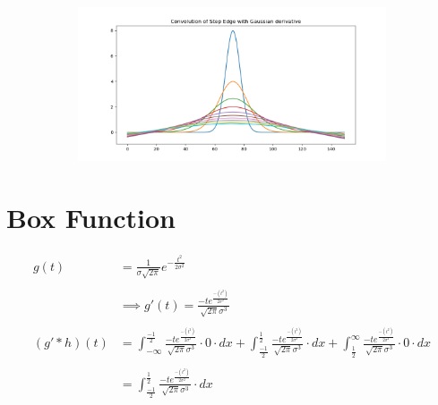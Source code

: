 \documentclass[12pt, oneside]{article}
\begin{document}
\begin{figure}[H]
    \centering
    \begin{subfigure}[b]{1\textwidth}
        \centering
        \includegraphics[width=\textwidth]{imgs/q3_plot.png}
    \end{subfigure}
    \caption{}
\end{figure}

\section{Box Function}

\begin{align*}
    g(t) &= \frac{1}{\sigma \sqrt{2 \pi}}e^{-\frac{t^2}{2 \sigma ^ 2}}  \\\\
    &\implies g'(t) =  \frac{-t e^{\frac{-(t ^ 2)}{2 \sigma ^ 2}} }{ 
    \sqrt{2 \pi} \sigma ^ 3} \\\\
    (g' * h)(t) &= 
    \int_{-\infty}^{\frac{-1}{2}} 
    \frac{-t e^{\frac{-(t ^ 2)}{2 \sigma ^ 2}} }{ 
    \sqrt{2 \pi} \sigma ^ 3}
    \cdot
    0 \cdot dx  +
    \int_{\frac{-1}{2}}^{\frac{1}{2}} 
    \frac{-t e^{\frac{-(t ^ 2)}{2 \sigma ^ 2}} }{ 
    \sqrt{2 \pi} \sigma ^ 3} \cdot dx  +
    \int_{\frac{1}{2}}^{\infty} 
    \frac{-t e^{\frac{-(t ^ 2)}{2 \sigma ^ 2}} }{ 
    \sqrt{2 \pi} \sigma ^ 3}
    \cdot
    0 \cdot dx  \\\\
    &= 
    \int_{\frac{-1}{2}}^{\frac{1}{2}} 
    \frac{-t e^{\frac{-(t ^ 2)}{2 \sigma ^ 2}} }{ 
    \sqrt{2 \pi} \sigma ^ 3} \cdot dx  
\end{align*}
\end{document}
